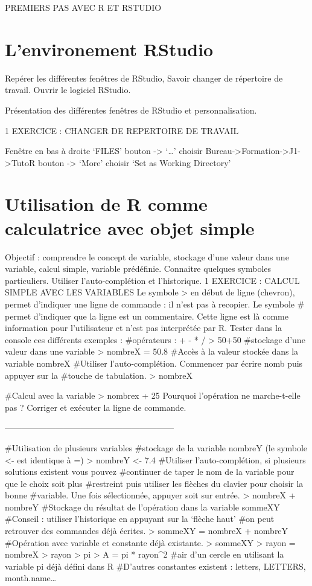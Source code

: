 ﻿PREMIERS PAS AVEC R ET RSTUDIO

\section{L'environement RStudio}

 Repérer les différentes fenêtres de RStudio, Savoir changer de répertoire de travail.
Ouvrir le logiciel RStudio.

Présentation des différentes fenêtres de RStudio et personnalisation.

1	EXERCICE : CHANGER DE REPERTOIRE DE TRAVAIL

Fenêtre en bas à droite  ‘FILES' bouton  -> ‘…' choisir Bureau->Formation->J1->TutoR
                           bouton -> ‘More' choisir  ‘Set as Working Directory'

\section{Utilisation de R comme calculatrice avec objet simple}
Objectif : comprendre le concept de variable, stockage d'une valeur dans une variable, calcul simple, variable prédéfinie. Connaitre quelques symboles particuliers. Utiliser l'auto-complétion et l'historique.
1	EXERCICE : CALCUL SIMPLE AVEC LES VARIABLES
Le symbole > en début de ligne (chevron), permet d'indiquer une ligne de commande : il n'est pas à recopier.
Le symbole \# permet d'indiquer que la ligne est un commentaire. Cette ligne est là comme information pour l'utilisateur et n'est pas interprétée par R.
Tester dans la console ces différents exemples :
\#opérateurs :    + - * /
> 50+50
\#stockage d'une valeur dans une variable
> nombreX = 50.8
\#Accès à la valeur stockée dans la variable nombreX
\#Utiliser l'auto-complétion. Commencer par écrire nomb puis appuyer sur la \#touche de tabulation.
> nombreX

\#Calcul avec la variable 				
> nombrex + 25
Pourquoi l'opération ne marche-t-elle pas ? Corriger et exécuter la ligne de commande.

------------------------------------------------------------

\#Utilisation de plusieurs variables
\#stockage de la variable nombreY (le symbole <- est identique à =)
> nombreY <- 7.4
\#Utiliser l'auto-complétion, si plusieurs solutions existent vous pouvez  \#continuer de taper le nom de la variable pour que le choix soit plus \#restreint puis utiliser les flèches du clavier pour choisir la bonne \#variable. Une fois sélectionnée, appuyer soit sur entrée.
> nombreX + nombreY
\#Stockage du résultat de l'opération dans la variable sommeXY
\#Conseil : utiliser l'historique en appuyant sur la ‘flèche haut'
\#on peut retrouver des commandes déjà écrites.		
> sommeXY = nombreX + nombreY		
\#Opération avec variable et constante déjà existante.
> sommeXY					
> rayon = nombreX
> rayon
> pi
> A = pi * rayon^2 \#air d'un cercle en utilisant la variable pi déjà défini dans R
\#D'autres constantes existent : letters, LETTERS, month.name…


